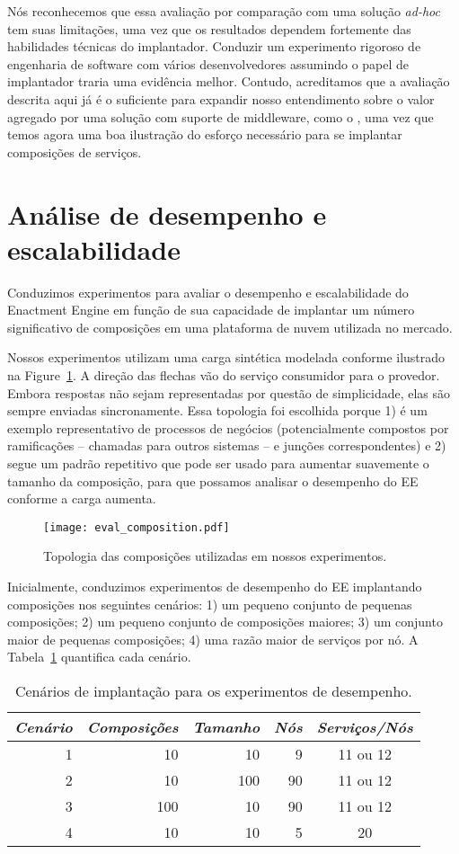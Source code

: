 Nós reconhecemos que essa avaliação por comparação com uma solução \emph{ad-hoc}
tem suas limitações, uma vez que os resultados dependem fortemente das
habilidades técnicas do implantador.
Conduzir um experimento rigoroso de engenharia de software com vários
desenvolvedores assumindo o papel de implantador traria uma evidência melhor.
Contudo, acreditamos que a avaliação descrita aqui já é o suficiente
para expandir nosso entendimento sobre o valor agregado por uma solução
com suporte de middleware, como o \ee, uma vez que temos agora uma boa ilustração
do esforço necessário para se implantar composições de serviços.

\section{Análise de desempenho e escalabilidade}

Conduzimos experimentos para avaliar o desempenho e escalabilidade do
Enactment Engine em função de sua capacidade de implantar um número significativo
de composições em uma plataforma de nuvem utilizada no mercado.

Nossos experimentos utilizam uma carga sintética modelada conforme ilustrado na Figure~\ref{fig:eval_composition}.
A direção das flechas vão do serviço consumidor para o provedor.
Embora respostas não sejam representadas por questão de simplicidade,
elas são sempre enviadas sincronamente.
Essa topologia foi escolhida porque 1) é um exemplo representativo de processos de negócios
(potencialmente compostos por ramificações -- chamadas para outros sistemas -- e junções correspondentes)
e 2) segue um padrão repetitivo que pode ser usado para aumentar suavemente o tamanho da composição,
para que possamos analisar o desempenho do EE conforme a carga aumenta.


\begin{figure}[h]
  \centering
  \texttt{[image: eval\_composition.pdf]}
  \caption{Topologia das composições utilizadas em nossos experimentos.}
  \label{fig:eval_composition}
\end{figure}


Inicialmente, conduzimos experimentos
de desempenho do EE implantando composições nos seguintes cenários:
1) um pequeno conjunto de pequenas composições;
2) um pequeno conjunto de composições maiores;
3) um conjunto maior de pequenas composições;
4) uma razão maior de serviços por nó.
A Tabela~\ref{tab:cases} quantifica cada cenário.

\begin{table}
\centering
\caption{Cenários de implantação para os experimentos de desempenho.}
\label{tab:cases}
\begin{tabular}{r r r r c} \hline
\emph{Cenário} & \emph{Composições} & \emph{Tamanho} & \emph{Nós} & \emph{Serviços/Nós} \\ \hline
1 &  10 &  10 &  9 & 11 ou 12 \\
2 &  10 & 100 & 90 & 11 ou 12 \\
3 & 100 &  10 & 90 & 11 ou 12 \\
4 &  10 &  10 &  5 &       20 \\
\hline \end{tabular}
\end{table}

